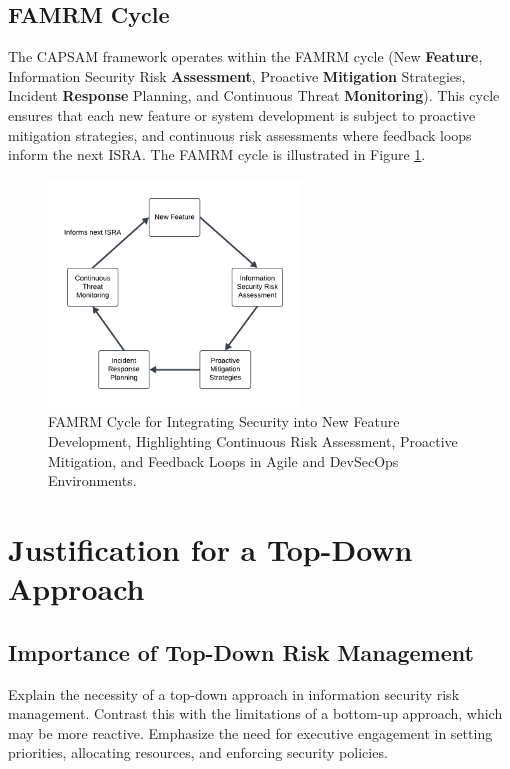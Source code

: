     \subsection{FAMRM Cycle}
    The CAPSAM framework operates within the FAMRM cycle (New \textbf{Feature}, Information Security Risk \textbf{Assessment}, Proactive \textbf{Mitigation} Strategies, Incident \textbf{Response} Planning, and Continuous Threat \textbf{Monitoring}). This cycle ensures that each new feature or system development is subject to proactive mitigation strategies, and continuous risk assessments where feedback loops inform the next ISRA. The FAMRM cycle is illustrated in Figure \ref{fig:FAMRM}.

    \begin{figure}[htbp]
        \centering
        \includegraphics[width=0.6\textwidth]{figures/FAMRM-Cycle.png}
        \caption{FAMRM Cycle for Integrating Security into New Feature Development, Highlighting Continuous Risk Assessment, Proactive Mitigation, and Feedback Loops in Agile and DevSecOps Environments.}
        \label{fig:FAMRM}
    \end{figure}

\section{Justification for a Top-Down Approach}
    \subsection{Importance of Top-Down Risk Management}
    Explain the necessity of a top-down approach in information security risk management. Contrast this with the limitations of a bottom-up approach, which may be more reactive. Emphasize the need for executive engagement in setting priorities, allocating resources, and enforcing security policies.

